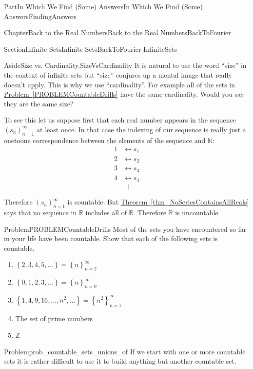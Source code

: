 \documentclass[oneside,10pt,]{book}
\newcommand{\xreffont}{\relax}
\numberwithin{equation}{part}
\newcommand{\RR}{\mathbb {R}}
\newcommand{\NN}{\mathbb {N}}
\newcommand{\ZZ}{\mathbb {Z}}
\newcommand{\amp}{&}
\begin{document}
\begin{partptx}{Part}{In Which We Find (Some) Answers}{}{In Which We Find (Some) Answers}{}{}{FindingAnswers}
\begin{chapterptx}{Chapter}{Back to the Real Numbers}{}{Back to the Real Numbers}{}{}{BackToFourier}
\begin{sectionptx}{Section}{Infinite Sets}{}{Infinite Sets}{}{}{BackToFourier-InfiniteSets}
\begin{aside}{Aside}{Size vs. Cardinality.}{SizeVsCardinality}%
It is natural to use the word ``size'' in the context of infinite sets but ``size'' conjures up a mental image that really doesn't apply. This is why we use ``cardinality''. For example all of the sets in \hyperref[PROBLEMCountableDrills]{Problem~{\xreffont\ref{PROBLEMCountableDrills}}} have the same cardinality. Would you say they are the same size?%
\end{aside}
To see this let us suppose first that each real number appears in the sequence \((s_n)_{n=1}^\infty\) at least once.  In that case the indexing of our sequence is really just a one\textendash{}to\textendash{}one correspondence between the elements of the sequence and \(\NN:\)%
\begin{align*}
1\amp \leftrightarrow s_1\\
2\amp \leftrightarrow s_2\\
3\amp \leftrightarrow s_3\\
4\amp \leftrightarrow s_4\\
\amp \ \ \ \vdots
\end{align*}
%
\par
Therefore \(\left(s_n\right)_{n=1}^\infty \) is countable. But \hyperref[thm_NoSeriesContainsAllReals]{Theorem~{\xreffont\ref{thm_NoSeriesContainsAllReals}}} says that no sequence in \(\RR\) includes all of \(\RR\).  Therefore \(\RR\) is uncountable.%
\begin{problem}{Problem}{}{PROBLEMCountableDrills}%
Most of the sets you have encountered so far in your life have been countable.  Show that each of the following sets is countable.%
\begin{enumerate}[font=\bfseries,label=(\alph*),ref=\alph*]%
\item{}\(\left\{2,3,4,5,\ldots\right\}=\left\{n\right\}_{n=2}^\infty\)%
\item{}\(\left\{0,1,2,3,\ldots\right\}=\left\{n\right\}_{n=0}^\infty\)%
\item{}\(\left\{1,4,9,16,\ldots,n^2,\ldots\right\}=\left\{n^2\right\}_{n=1}^\infty\)%
\item{}The set of prime numbers%
\item{}\(\ZZ\)%
\end{enumerate}%
\end{problem}
\begin{problem}{Problem}{}{prob_countable_sets_unions_of}%
If we start with one or more countable sets it is rather difficult to use it to build anything but another countable set.%

\end{problem}
\end{sectionptx}
\end{chapterptx}
\end{partptx}
\end{document}

